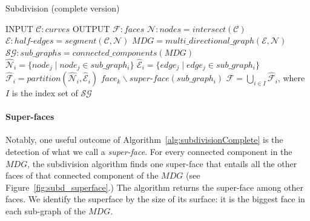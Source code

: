 \begin{algorithm}
  \caption {Subdivision (complete version)}
  \label{alg:subdivisionComplete}
  \begin{algorithmic}
    \STATE INPUT  $\mathcal{C}:curves$
    \STATE OUTPUT  $\mathcal{F}:faces$
    \STATE \quad
    \STATE $\mathcal{N}:nodes = \mathit{intersect} \left( \mathcal{C} \right)$
    \STATE $\mathcal{E}:half\text{-}edges = \mathit{segment} \left( \mathcal{C}, \mathcal{N} \right)$
    \STATE $\mathit{MDG}= \mathit{multi\_directional\_graph} \left( \mathcal{E}, \mathcal{N} \right)$
    \STATE $\mathcal{SG}:sub\_graphs = connected\_components(\mathit{MDG})$
    \STATE \quad
    \STATE $ \hat{\mathcal{N}}_i = \{node_j \mid node_j \in sub\_graph_i \} $
    \STATE $ \hat{\mathcal{E}}_i = \{edge_j \mid edge_j \in sub\_graph_i \} $
    \STATE $ \hat{\mathcal{F}}_i= \mathit{partition} \left( \hat{\mathcal{N}}_i, \hat{\mathcal{E}}_i \right)$
    \ENDFOR
    \STATE \quad
    \STATE $face_k \backslash super\text{-}face\left(sub\_graph_i\right)$
    \ENDIF
    \ENDFOR
    \STATE \quad
    \STATE $ \mathcal{F} = \displaystyle \bigcup_{i\in I} \hat{\mathcal{F}}_i $, \quad where $I$ is the index set of $\mathcal{SG}$
  \end{algorithmic}
\end{algorithm}


\paragraph{Super-faces}
Notably, one useful outcome of Algorithm~\ref{alg:subdivisionComplete} is the detection of what we call a \emph{super-face}.
For every connected component in the $\mathit{MDG}$, the subdivision algorithm finds one super-face that entails all the other faces of that connected component of the $\mathit{MDG}$ (see Figure~\ref{fig:subd_superface}.)
The algorithm returns the super-face among other faces.
We identify the superface by the size of its surface: it is the biggest face in each sub-graph of the $\mathit{MDG}$.

